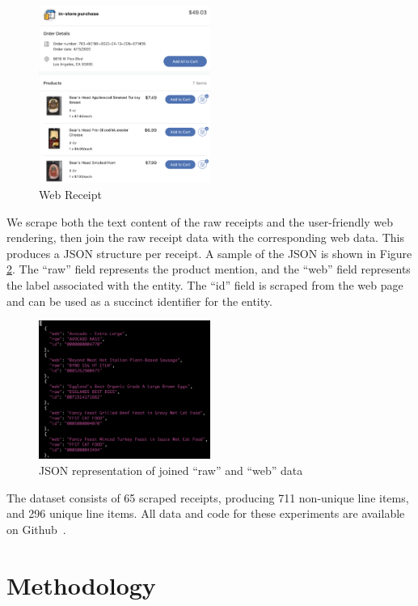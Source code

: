 \documentclass[11pt,a4paper]{article}
\begin{document}
\begin{figure}[h]
  \centering
\includegraphics[width=0.5\textwidth]{web_receipt}
\caption{Web Receipt}
\label{fig:web}
\end{figure}

We scrape both the text content of the raw receipts and the
user-friendly web rendering, then join the raw receipt data with the
corresponding web data.  This produces a JSON structure per receipt.
A sample of the JSON is shown in Figure \ref{fig:json}.  The ``raw''
field represents the product mention, and the ``web'' field represents
the label associated with the entity.  The ``id'' field is scraped from
the web page and can be used as a succinct identifier for the entity. 

\begin{figure}[h]
  \centering
\includegraphics[width=0.5\textwidth]{json}
\caption{JSON representation of joined ``raw'' and ``web'' data}
\label{fig:json}
\end{figure}

The dataset consists of 65 scraped receipts, producing 711 non-unique
line items, and 296 unique line items.  All data and code for these
experiments are available on Github~\cite{github}.


\section{Methodology}
\end{document}
